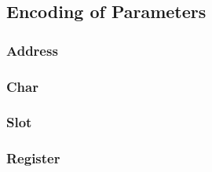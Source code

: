 \subsection{Encoding of Parameters}

\subsubsection{Address}

\subsubsection{Char}

\subsubsection{Slot}

\subsubsection{Register}
